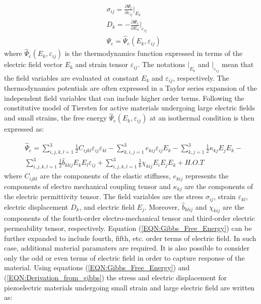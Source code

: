 \begin{equation}
\begin{aligned}
&\sigma _{ij} = \frac{\partial \Psi_e}{\partial \varepsilon_{ij}}\vert _{E_{k}}
\\
& D_k = -\frac{\partial \Psi_e}{\partial E_k}\vert _{\varepsilon_{ij}}\\
& \Psi_e= \hat{\Psi}_e(E_k,\varepsilon_{ij})
\end{aligned}
\label{EQN:Derivation_from_gibbs}
\end{equation}
where $\hat{\Psi}_e(E_k,\varepsilon_{ij})$ is the thermodynamics function expressed in terms of the electric field vector $E_k$ and strain tensor $\varepsilon_{ij}$. 
The notations $\vert _{E_{k}}$ and $\vert _{\varepsilon_{ij}}$ mean that the field variables are evaluated at constant $E_{k}$ and $\varepsilon_{ij}$, respectively.
The thermodynamics potentials are often expressed in a Taylor series expansion of the independent field variables that can include higher order terms. 
Following the constitutive model of Tiersten \cite{tiersten1993electroelastic}
for active materials undergoing large electric fields and small strains, 
the free energy $\hat{\Psi}_e(E_k,\varepsilon_{ij})$ at an isothermal condition is then expressed as:

\begin{equation}
\begin{aligned}
&\hat{\Psi}_e=
\sum_{i,j,k,l=1}^{3} \frac{1}{2}C_{ijkl}{\varepsilon _{ij}}{\varepsilon _{kl}}-
\sum_{k,i,j=1}^3 e_{kij}\varepsilon _{ij}E_k-
\sum_{k,j=1}^3 \frac{1}{2}\kappa _{kj}{E_j}{E_k}-\\
&
\sum_{i,j,k,l=1}^3 \frac{1}{2}\hat{b}_{klij}{E_k}{E_l}\varepsilon _{ij}+
\sum_{i,j,k,l=1}^3 \frac{1}{6}\chi_{kij}{E_i}{E_j}{E_k}+H.O.T
\end{aligned}
\label{EQN:Gibbs_Free_Energy}
\end{equation}
where $C_{ijkl}$ are the components of the elastic stiffness, $e_{kij}$ represents the components of electro mechanical coupling tensor and $\kappa _{kj}$ are the components of the electric permittivity tensor. The field variables are the stress $\sigma _{ij}$, strain $\varepsilon _{kl}$, electric displacement $D_k$, and electric field $E_j$.
Moreover, $\hat{b}_{klij}$ and $\chi_{kij}$ are the components of the fourth-order electro-mechanical tensor and third-order electric permeability tensor, respectively. 
Equation  (\ref{EQN:Gibbs_Free_Energy}) can be further expanded to include fourth, fifth, etc. order terms of electric field.
In such case, additional material paramaters are required.
It is also possible to consider only the odd or even terms of electric field in order to capture response of the material.
Using equations  (\ref{EQN:Gibbs_Free_Energy}) and (\ref{EQN:Derivation_from_gibbs}) the stress and electric displacement for piezoelectric materials undergoing small strain and large electric field are written as:
 
